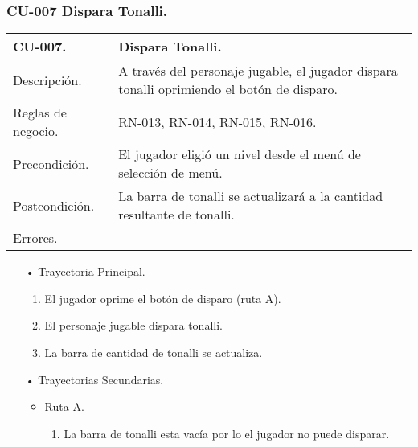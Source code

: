 \subsubsection{CU-007 Dispara Tonalli.} \label{CU:07}
\begin{longtable}[c]{ | m{5cm} | m{10cm}|} 
		\hline
		\rowcolor{cyan}CU-007. & Dispara Tonalli.\\ 
		\hline
		Descripción. & A través del personaje jugable, el jugador dispara tonalli oprimiendo el botón de disparo. \\ 
		\hline
		Reglas de negocio. & RN-013, RN-014, RN-015, RN-016.\\ 
		\hline
		Precondición. & El jugador eligió un nivel desde el menú de selección de menú.\\
		\hline
		Postcondición. & La barra de tonalli se actualizará a la cantidad resultante de tonalli.\\
		\hline
		Errores. & \\
		\hline
\end{longtable}
\begin{itemize}
	\item[•] Trayectoria Principal.
		\begin{enumerate}
			\item El jugador oprime el botón de disparo (ruta A).
			\item El personaje jugable dispara tonalli.
			\item La barra de cantidad de tonalli se actualiza.
		\end{enumerate}
	\item[•] Trayectorias Secundarias.
		\begin{itemize}
			\item Ruta A.
				\begin{enumerate}
					\item La barra de tonalli esta vacía por lo el jugador no puede disparar.
				\end{enumerate}
		\end{itemize}
\end{itemize}